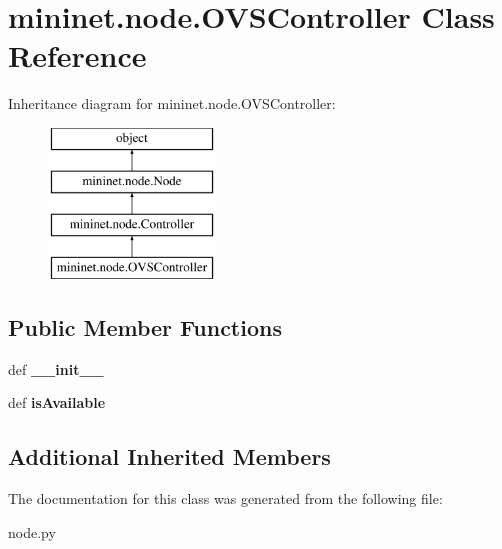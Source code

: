 \hypertarget{classmininet_1_1node_1_1OVSController}{\section{mininet.\-node.\-O\-V\-S\-Controller Class Reference}
\label{classmininet_1_1node_1_1OVSController}
}
Inheritance diagram for mininet.\-node.\-O\-V\-S\-Controller\-:\begin{figure}[H]
\begin{center}
\leavevmode
\includegraphics[height=4.000000cm]{classmininet_1_1node_1_1OVSController}
\end{center}
\end{figure}
\subsection*{Public Member Functions}
\begin{DoxyCompactItemize}
\item 
\hypertarget{classmininet_1_1node_1_1OVSController_a762db0702455de1de209205b977fe7e0}{def {\bfseries \-\_\-\-\_\-init\-\_\-\-\_\-}}\label{classmininet_1_1node_1_1OVSController_a762db0702455de1de209205b977fe7e0}

\item 
\hypertarget{classmininet_1_1node_1_1OVSController_a2ce3cc322466ab2cbcc27dc4aabaea65}{def {\bfseries is\-Available}}\label{classmininet_1_1node_1_1OVSController_a2ce3cc322466ab2cbcc27dc4aabaea65}

\end{DoxyCompactItemize}
\subsection*{Additional Inherited Members}


The documentation for this class was generated from the following file\-:\begin{DoxyCompactItemize}
\item 
node.\-py\end{DoxyCompactItemize}
